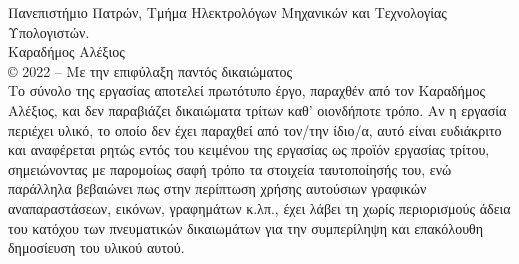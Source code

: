 \pagestyle{empty}
\mbox{}
\vfill
Πανεπιστήμιο Πατρών, Τμήμα Ηλεκτρολόγων Μηχανικών και Τεχνολογίας Υπολογιστών. \\
Καραδήμος Αλέξιος\\
© 2022 – Με την επιφύλαξη παντός δικαιώματος\\
Το σύνολο της εργασίας αποτελεί πρωτότυπο έργο, παραχθέν από τον Καραδήμος Αλέξιος, 
και δεν παραβιάζει δικαιώματα τρίτων καθ’ οιονδήποτε τρόπο. Αν η εργασία περιέχει υλικό, 
το οποίο δεν έχει παραχθεί από τον/την ίδιο/α, αυτό είναι ευδιάκριτο και αναφέρεται 
ρητώς εντός του κειμένου της εργασίας ως προϊόν εργασίας τρίτου, σημειώνοντας με παρομοίως 
σαφή τρόπο τα στοιχεία ταυτοποίησής του, ενώ παράλληλα βεβαιώνει πως στην περίπτωση χρήσης 
αυτούσιων γραφικών αναπαραστάσεων, εικόνων, γραφημάτων κ.λπ., έχει λάβει τη χωρίς περιορισμούς 
άδεια του κατόχου των πνευματικών δικαιωμάτων για την συμπερίληψη και επακόλουθη δημοσίευση του υλικού αυτού.